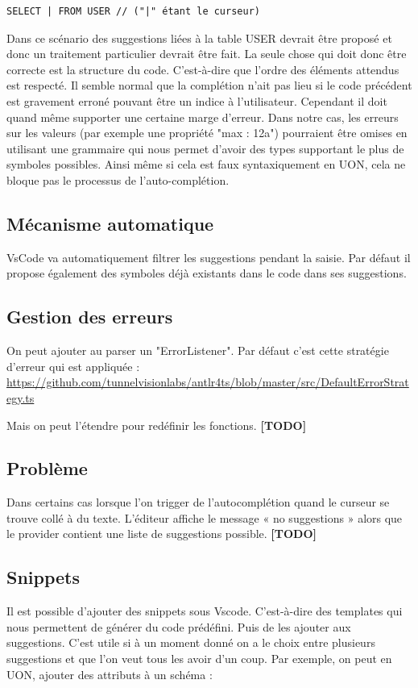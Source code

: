 \documentclass[
    iict, %
    il, %
]{heig-tb}
\begin{document}
\begin{lstlisting}
SELECT | FROM USER // ("|" étant le curseur)
\end{lstlisting}

Dans ce scénario des suggestions liées à la table USER devrait être proposé et donc un traitement particulier devrait être fait.
La seule chose qui doit donc être correcte est la structure du code. C’est-à-dire que l’ordre des éléments attendus est respecté.
Il semble normal que la complétion n’ait pas lieu si le code précédent est gravement erroné pouvant être un indice à l’utilisateur. Cependant il doit quand même supporter une certaine marge d’erreur. Dans notre cas, les erreurs sur les valeurs (par exemple une propriété "max : 12a") pourraient être omises en utilisant une grammaire qui nous permet d’avoir des types supportant le plus de symboles possibles. Ainsi même si cela est faux syntaxiquement en UON, cela ne bloque pas le processus de l’auto-complétion.

\subsection{Mécanisme automatique}
VsCode va automatiquement filtrer les suggestions pendant la saisie.
Par défaut il propose également des symboles déjà existants dans le code dans ses suggestions.

\subsection{Gestion des erreurs}
On peut ajouter au parser un "ErrorListener".
Par défaut c’est cette stratégie d’erreur qui est appliquée :
\href{https://github.com/tunnelvisionlabs/antlr4ts/blob/master/src/DefaultErrorStrategy.ts}{https://github.com/tunnelvisionlabs/antlr4ts/blob/master/src/DefaultErrorStrategy.ts}

Mais on peut l’étendre pour redéfinir les fonctions.
\textbf{[TODO]}

\subsection{Problème}
Dans certains cas lorsque l’on trigger de l’autocomplétion quand le curseur se trouve collé à du texte. L’éditeur affiche le message « no suggestions » alors que le provider contient une liste de suggestions possible.
\textbf{[TODO]}

\subsection{Snippets}
Il est possible d’ajouter des snippets sous Vscode. C’est-à-dire des templates qui nous permettent de générer du code prédéfini. Puis de les ajouter aux suggestions.
C’est utile si à un moment donné on a le choix entre plusieurs suggestions et que l’on veut tous les avoir d’un coup.
Par exemple, on peut en UON, ajouter des attributs à un schéma :
\end{document}
